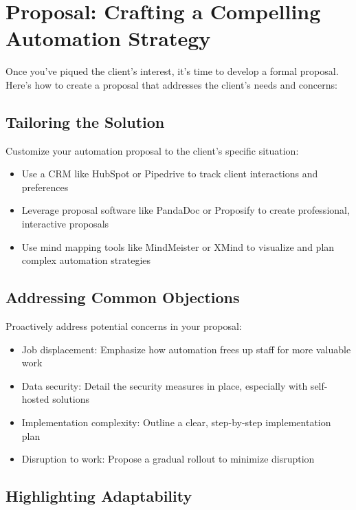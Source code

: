 \section{Proposal: Crafting a Compelling Automation Strategy}

Once you've piqued the client's interest, it's time to develop a formal proposal. Here's how to create a proposal that addresses the client's needs and concerns:

\subsection{Tailoring the Solution}

Customize your automation proposal to the client's specific situation:

\begin{itemize}
    \item Use a CRM like HubSpot or Pipedrive to track client interactions and preferences
    \item Leverage proposal software like PandaDoc or Proposify to create professional, interactive proposals
    \item Use mind mapping tools like MindMeister or XMind to visualize and plan complex automation strategies
\end{itemize}

\subsection{Addressing Common Objections}

Proactively address potential concerns in your proposal:

\begin{itemize}
    \item Job displacement: Emphasize how automation frees up staff for more valuable work
    \item Data security: Detail the security measures in place, especially with self-hosted solutions
    \item Implementation complexity: Outline a clear, step-by-step implementation plan
    \item Disruption to work: Propose a gradual rollout to minimize disruption
\end{itemize}

\subsection{Highlighting Adaptability}

